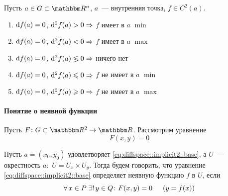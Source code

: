 \documentclass[12pt,trimbord]{../../../notes}
\begin{document}
\begin{thrm}\label{thrm:diffspace::extrema::suff}
  Пусть $a\in G \subset \R^n$, $a$~--- внутренняя точка, $f\in C^2(a)$.
  \begin{enumerate}
    \item $\mathrm{d} f(a) = 0$, $\mathrm{d}^2 f(a) > 0 \Rightarrow$ $f$ имеет в $a$ $\min$
    \item $\mathrm{d} f(a) = 0$, $\mathrm{d}^2 f(a) < 0 \Rightarrow$ $f$ имеет в $a$ $\max$
    \item $\mathrm{d} f(a) = 0$, $\mathrm{d}^2 f(a) \lessgtr 0 \Rightarrow$ ничего нет
    \item $\mathrm{d} f(a) = 0$, $\mathrm{d}^2 f(a) \leqslant 0 \Rightarrow$ $f$ не имеет в $a$ $\min$
    \item $\mathrm{d} f(a) = 0$, $\mathrm{d}^2 f(a) \geqslant 0 \Rightarrow$ $f$ не имеет в $a$ $\max$
  \end{enumerate}
\end{thrm}

\paragraph{Понятие о неявной функции}
\label{par:diffspace::implicit2}

\begin{defn}\label{defn:diffspace::implicit2}
  Пусть $F\colon G \subset \R^2 \to \R$. Рассмотрим уравнение
  \begin{equation}
    \label{eq:diffspace::implicit2::base}
    F(x, y) = 0
  \end{equation}

  Пусть $a =(x_0, y_0)$ удовлетворяет \ref{eq:diffspace::implicit2::base}, 
  а $U$~--- окрестность $a \colon$ $U = U_x \times U_y$.
  Тогда будем говорить, что уравнение \ref{eq:diffspace::implicit2::base} определяет неявную 
  функцию $f$ в $U$, если
  \[
    \forall\, x\in P \; \exists!\, y\in Q \colon F(x,y) = 0 \hspace{1.5em} (y = f(x))
  \]
\end{defn}
\end{document}
